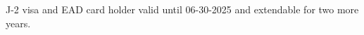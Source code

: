 



\begin{cvparagraph}
J-2 visa and EAD card holder valid until 06-30-2025 and extendable for two more years.
\end{cvparagraph}

